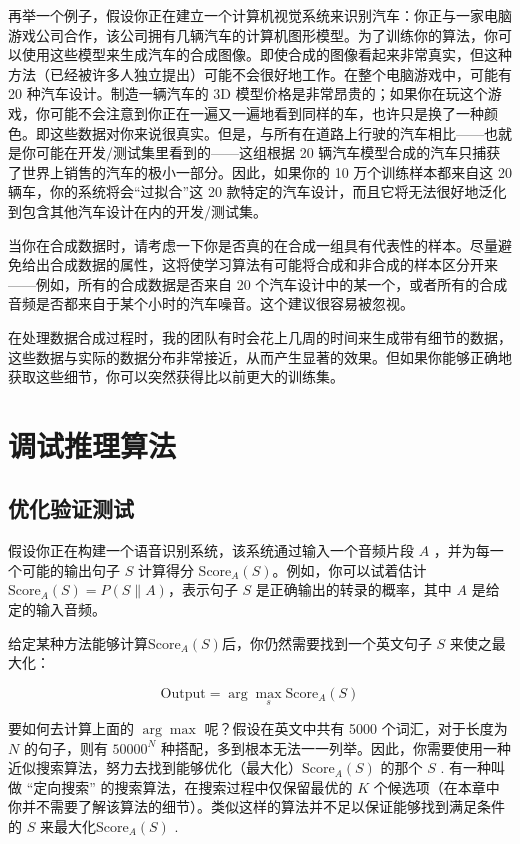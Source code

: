再举一个例子，假设你正在建立一个计算机视觉系统来识别汽车：你正与一家电脑游戏公司合作，该公司拥有几辆汽车的计算机图形模型。为了训练你的算法，你可以使用这些模型来生成汽车的合成图像。即使合成的图像看起来非常真实，但这种方法（已经被许多人独立提出）可能不会很好地工作。在整个电脑游戏中，可能有
20 种汽车设计。制造一辆汽车的 3D
模型价格是非常昂贵的；如果你在玩这个游戏，你可能不会注意到你正在一遍又一遍地看到同样的车，也许只是换了一种颜色。即这些数据对你来说很真实。但是，与所有在道路上行驶的汽车相比------也就是你可能在开发/测试集里看到的------这组根据
20
辆汽车模型合成的汽车只捕获了世界上销售的汽车的极小一部分。因此，如果你的
10 万个训练样本都来自这 20 辆车，你的系统将会``过拟合''这 20
款特定的汽车设计，而且它将无法很好地泛化到包含其他汽车设计在内的开发/测试集。

当你在合成数据时，请考虑一下你是否真的在合成一组具有代表性的样本。尽量避免给出合成数据的属性，这将使学习算法有可能将合成和非合成的样本区分开来------例如，所有的合成数据是否来自
20
个汽车设计中的某一个，或者所有的合成音频是否都来自于某个小时的汽车噪音。这个建议很容易被忽视。

在处理数据合成过程时，我的团队有时会花上几周的时间来生成带有细节的数据，这些数据与实际的数据分布非常接近，从而产生显著的效果。但如果你能够正确地获取这些细节，你可以突然获得比以前更大的训练集。

\hypertarget{ux8c03ux8bd5ux63a8ux7406ux7b97ux6cd5}{%
\part{调试推理算法}\label{ux8c03ux8bd5ux63a8ux7406ux7b97ux6cd5}}

\hypertarget{ux4f18ux5316ux9a8cux8bc1ux6d4bux8bd5}{%
\chapter{优化验证测试}\label{ux4f18ux5316ux9a8cux8bc1ux6d4bux8bd5}}

假设你正在构建一个语音识别系统，该系统通过输入一个音频片段 \(A​\)
，并为每一个可能的输出句子 \(S​\) 计算得分
\(\text{Score}_A(S)​\)。例如，你可以试着估计\(\text{Score}_A(S)=P(S\|A)​\)，表示句子
\(S​\) 是正确输出的转录的概率，其中 \(A​\) 是给定的输入音频。

给定某种方法能够计算\(\text {Score}_A(S)\)后，你仍然需要找到一个英文句子
\(S\) 来使之最大化：

\[
\text{Output} = \arg \max_s \text{Score}_A(S)
\]

要如何去计算上面的 \(\arg \max\) 呢？假设在英文中共有 5000
个词汇，对于长度为 \(N\) 的句子，则有 \(50000^N\)
种搭配，多到根本无法一一列举。因此，你需要使用一种近似搜索算法，努力去找到能够优化（最大化）\(\text{Score}_A(S)\)
的那个 \(S\) . 有一种叫做 ``定向搜索''
的搜索算法，在搜索过程中仅保留最优的 \(K\)
个候选项（在本章中你并不需要了解该算法的细节）。类似这样的算法并不足以保证能够找到满足条件的
\(S\) 来最大化\(\text{Score}_A(S)\) .

